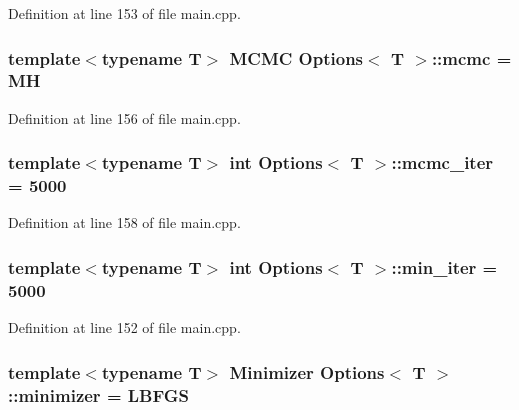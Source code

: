Definition at line 153 of file main.\-cpp.

\hypertarget{struct_options_a658501e489501c4ce7c139257ee57d93}{
\subsubsection[{mcmc}]{\setlength{\rightskip}{0pt plus 5cm}template$<$typename T$>$ {\bf M\-C\-M\-C} {\bf Options}$<$ T $>$\-::mcmc = {\bf M\-H}}}\label{struct_options_a658501e489501c4ce7c139257ee57d93}


Definition at line 156 of file main.\-cpp.

\hypertarget{struct_options_a5f067cf738d25bcd5babfcfa5b109509}{
\subsubsection[{mcmc\-\_\-iter}]{\setlength{\rightskip}{0pt plus 5cm}template$<$typename T$>$ int {\bf Options}$<$ T $>$\-::mcmc\-\_\-iter = 5000}}\label{struct_options_a5f067cf738d25bcd5babfcfa5b109509}


Definition at line 158 of file main.\-cpp.

\hypertarget{struct_options_a38be912695cadd656ec4638440eb452e}{
\subsubsection[{min\-\_\-iter}]{\setlength{\rightskip}{0pt plus 5cm}template$<$typename T$>$ int {\bf Options}$<$ T $>$\-::min\-\_\-iter = 5000}}\label{struct_options_a38be912695cadd656ec4638440eb452e}


Definition at line 152 of file main.\-cpp.

\hypertarget{struct_options_ab1527f6ea213b470e60f0bfb673e6626}{
\subsubsection[{minimizer}]{\setlength{\rightskip}{0pt plus 5cm}template$<$typename T$>$ {\bf Minimizer} {\bf Options}$<$ T $>$\-::minimizer = {\bf L\-B\-F\-G\-S}}}\label{struct_options_ab1527f6ea213b470e60f0bfb673e6626}


